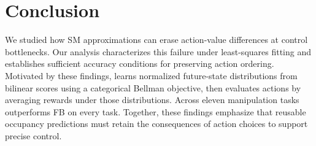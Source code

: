 \begin{table}[t]
    \centering
    \caption{\textbf{ExoRL (DMC returns).} Results are mean $\pm$ SE over five seeds. \textbf{Bold} marks the best mean and others within its SE. $\Delta$ reports \name{}'s relative improvement over the next-best baseline (\%).}
    \label{tab:exorl}
    \renewcommand{\arraystretch}{1.0}
    \tiny

    {\setlength{\tabcolsep}{1.5pt}%
    }%
\end{table}


\section{Conclusion}
We studied how SM approximations can erase action-value differences at control bottlenecks. 
Our analysis characterizes this failure under least-squares fitting and establishes sufficient accuracy conditions for preserving action ordering. 
Motivated by these findings, \name{} learns normalized future-state distributions from bilinear scores using a categorical Bellman objective, then evaluates actions by averaging rewards under those distributions.
Across eleven manipulation tasks \name{} outperforms FB on every task. 
Together, these findings emphasize that reusable occupancy predictions must retain the consequences of action choices to support precise control.
